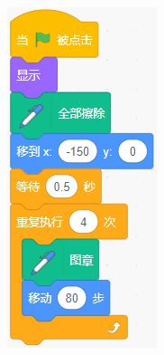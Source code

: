 \documentclass[10pt, a4paper]{article}
\begin{document}
\begin{enumerate}
\begin{figure}[htbp]
\begin{minipage}[t]{.2\textwidth}
\begin{minipage}[t]{.5\textwidth}
                \end{minipage}
                \begin{minipage}[t]{.45\textwidth}
                    \centering
                    \includegraphics[width=\textwidth]{figure/26-2.png}

\end{minipage}
\end{minipage}
\end{figure}
\end{enumerate}
\end{document}
